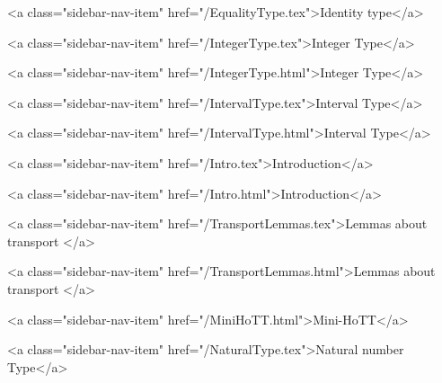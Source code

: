       
        
          <a class="sidebar-nav-item" href="/EqualityType.tex">Identity type</a>
        
      
    
      
        
          <a class="sidebar-nav-item" href="/IntegerType.tex">Integer Type</a>
        
      
    
      
        
          <a class="sidebar-nav-item" href="/IntegerType.html">Integer Type</a>
        
      
    
      
        
          <a class="sidebar-nav-item" href="/IntervalType.tex">Interval Type</a>
        
      
    
      
        
          <a class="sidebar-nav-item" href="/IntervalType.html">Interval Type</a>
        
      
    
      
        
          <a class="sidebar-nav-item" href="/Intro.tex">Introduction</a>
        
      
    
      
        
          <a class="sidebar-nav-item" href="/Intro.html">Introduction</a>
        
      
    
      
        
          <a class="sidebar-nav-item" href="/TransportLemmas.tex">Lemmas about transport </a>
        
      
    
      
        
          <a class="sidebar-nav-item" href="/TransportLemmas.html">Lemmas about transport </a>
        
      
    
      
        
          <a class="sidebar-nav-item" href="/MiniHoTT.html">Mini-HoTT</a>
        
      
    
      
        
          <a class="sidebar-nav-item" href="/NaturalType.tex">Natural number Type</a>
        
      
    
